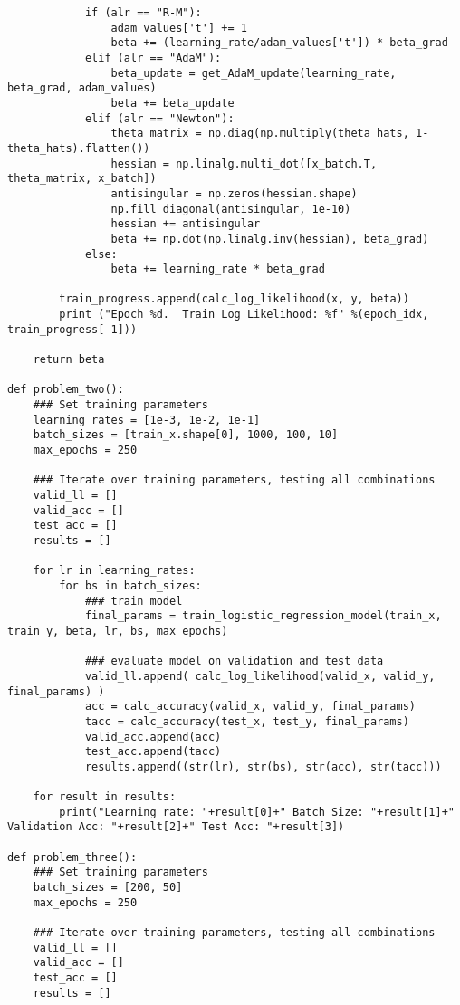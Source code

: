 \documentclass[11pt]{article}
\begin{document}
\begin{verbatim}
            if (alr == "R-M"):
                adam_values['t'] += 1
                beta += (learning_rate/adam_values['t']) * beta_grad
            elif (alr == "AdaM"):
                beta_update = get_AdaM_update(learning_rate, beta_grad, adam_values)
                beta += beta_update
            elif (alr == "Newton"):
                theta_matrix = np.diag(np.multiply(theta_hats, 1-theta_hats).flatten())
                hessian = np.linalg.multi_dot([x_batch.T, theta_matrix, x_batch])
                antisingular = np.zeros(hessian.shape)
                np.fill_diagonal(antisingular, 1e-10)
                hessian += antisingular
                beta += np.dot(np.linalg.inv(hessian), beta_grad)
            else:
                beta += learning_rate * beta_grad
        
        train_progress.append(calc_log_likelihood(x, y, beta))
        print ("Epoch %d.  Train Log Likelihood: %f" %(epoch_idx, train_progress[-1]))
        
    return beta

def problem_two():
    ### Set training parameters
    learning_rates = [1e-3, 1e-2, 1e-1]
    batch_sizes = [train_x.shape[0], 1000, 100, 10]
    max_epochs = 250
    
    ### Iterate over training parameters, testing all combinations
    valid_ll = []
    valid_acc = []
    test_acc = []
    results = []

    for lr in learning_rates:
        for bs in batch_sizes:
            ### train model
            final_params = train_logistic_regression_model(train_x, train_y, beta, lr, bs, max_epochs)
    
            ### evaluate model on validation and test data
            valid_ll.append( calc_log_likelihood(valid_x, valid_y, final_params) )
            acc = calc_accuracy(valid_x, valid_y, final_params)
            tacc = calc_accuracy(test_x, test_y, final_params)
            valid_acc.append(acc)
            test_acc.append(tacc)
            results.append((str(lr), str(bs), str(acc), str(tacc)))

    for result in results:
        print("Learning rate: "+result[0]+" Batch Size: "+result[1]+" Validation Acc: "+result[2]+" Test Acc: "+result[3])

def problem_three():
    ### Set training parameters
    batch_sizes = [200, 50]
    max_epochs = 250
    
    ### Iterate over training parameters, testing all combinations
    valid_ll = []
    valid_acc = []
    test_acc = []
    results = []


\end{verbatim}
\end{document}

